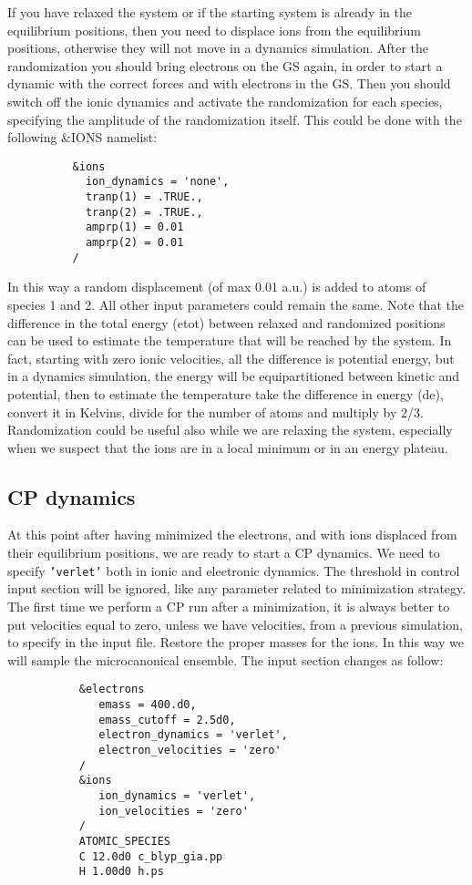 \documentclass[12pt,a4paper]{article}
\begin{document}
If you have relaxed the system or if the starting system is already in
the equilibrium positions, then you need to displace ions from the equilibrium 
positions, otherwise they will not move in a dynamics simulation.
After the randomization you should bring electrons on the GS again,
in order to start a dynamic with the correct forces and with electrons 
in the GS. Then you should switch off the ionic dynamics and activate 
the randomization for each species, specifying the amplitude of the 
randomization itself. This could be done with the following 
\&IONS namelist:
\begin{verbatim}
          &ions
            ion_dynamics = 'none',
            tranp(1) = .TRUE.,
            tranp(2) = .TRUE.,
            amprp(1) = 0.01
            amprp(2) = 0.01
          /
\end{verbatim}
In this way a random displacement (of max 0.01 a.u.) is added to atoms of 
species 1 and 2. All other input parameters could remain the same.
Note that the difference in the total energy (etot) between relaxed and
randomized positions can be used to estimate the temperature that will
be reached by the system. In fact, starting with zero ionic velocities,
all the difference is potential energy, but in a dynamics simulation, the
energy will be equipartitioned between kinetic and potential, then to
estimate the temperature take the difference in energy (de), convert it
in Kelvins, divide for the number of atoms and multiply by 2/3.
Randomization could be useful also while we are relaxing the system,
especially when we suspect that the ions are in a local minimum or in
an energy plateau.

\subsection{CP dynamics}

At this point after having minimized the electrons, and with ions displaced from their equilibrium positions, we are ready to start a CP
dynamics. We need to specify \texttt{'verlet'} both in ionic and electronic
dynamics. The threshold in control input section will be ignored, like
any parameter related to minimization strategy. The first time we perform 
a CP run after a minimization, it is always better to put velocities equal
to zero, unless we have velocities, from a previous simulation, to
specify in the input file. Restore the proper masses for the ions. In this
way we will sample the microcanonical ensemble. The input section
changes as follow:
\begin{verbatim}
           &electrons
              emass = 400.d0,
              emass_cutoff = 2.5d0,
              electron_dynamics = 'verlet',
              electron_velocities = 'zero'
           /
           &ions
              ion_dynamics = 'verlet',
              ion_velocities = 'zero'
           /
           ATOMIC_SPECIES
           C 12.0d0 c_blyp_gia.pp
           H 1.00d0 h.ps
\end{verbatim}
\end{document}
